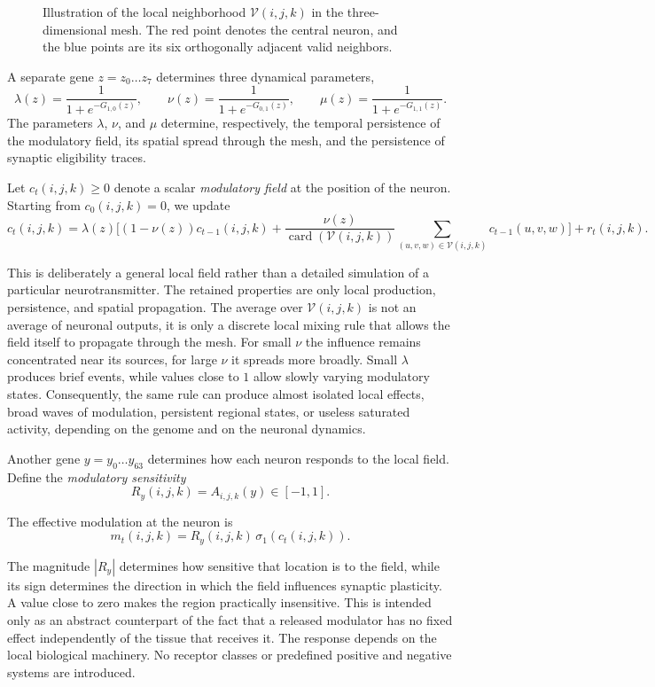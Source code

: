\documentclass[12pt,a4paper]{article}
\newcommand{\card}{\operatorname{card}}
\begin{document}
\begin{enumerate}
\begin{figure}[h]
\begin{tikzpicture}[
		x={(1cm,0cm)},
		y={(0.55cm,0.28cm)},
		z={(0cm,1cm)},
		scale=1.2,
		every node/.style={font=\small}
	]
	\end{tikzpicture}
	\caption{\footnotesize{Illustration of the local neighborhood $\mathcal{V}(i,j,k)$ in the three-dimensional mesh. The red point denotes the central neuron, and the blue points are its six orthogonally adjacent valid neighbors.}}
	\label{fig:local_neighborhood}
	\end{figure}

	A separate gene $z=z_0\ldots z_7$ determines three dynamical parameters,
	$$\lambda(z)=\frac{1}{1+e^{-G_{1,0}(z)}},\qquad \nu(z)=\frac{1}{1+e^{-G_{0,1}(z)}},\qquad \mu(z)=\frac{1}{1+e^{-G_{1,1}(z)}}.$$
	The parameters $\lambda$, $\nu$, and $\mu$ determine, respectively, the temporal persistence of the modulatory field, its spatial spread through the mesh, and the persistence of synaptic eligibility traces. 
	
	Let $c_t(i,j,k)\geq0$ denote a scalar \emph{modulatory field} at the position of the neuron. Starting from $c_0(i,j,k)=0$, we update	
	$$c_t(i,j,k)=\lambda(z)\Bigg[(1-\nu(z))c_{t-1}(i,j,k) + \frac{\nu(z)}{\card(\mathcal{V}(i,j,k))}\sum_{(u,v,w)\in\mathcal{V}(i,j,k)}c_{t-1}(u,v,w)\Bigg]+r_t(i,j,k).$$
	
	This is deliberately a general local field rather than a detailed simulation of a particular neurotransmitter. The retained properties are only local production, persistence, and spatial propagation. The average over $\mathcal{V}(i,j,k)$ is not an average of neuronal outputs, it is only a discrete local mixing rule that allows the field itself to propagate through the mesh. For small $\nu$ the influence remains concentrated near its sources, for large $\nu$ it spreads more broadly. Small $\lambda$ produces brief events, while values close to $1$ allow slowly varying modulatory states. Consequently, the same rule can produce almost isolated local effects, broad waves of modulation, persistent regional states, or useless saturated activity, depending on the genome and on the neuronal dynamics.

	Another gene $y=y_0\ldots y_{63}$ determines how each neuron responds to the local field. Define the \emph{modulatory sensitivity}
	$$R_y(i, j, k) = A_{i,j,k}(y)\in[-1,1].$$
	
	The effective modulation at the neuron is
	$$m_t(i,j,k)=R_y(i,j,k)\,\sigma_1\left(c_t(i,j,k)\right).$$
	
	The magnitude $|R_y|$ determines how sensitive that location is to the field, while its sign determines the direction in which the field influences synaptic plasticity. A value close to zero makes the region practically insensitive. This is intended only as an abstract counterpart of the fact that a released modulator has no fixed effect independently of the tissue that receives it. The response depends on the local biological machinery. No receptor classes or predefined positive and negative systems are introduced.


\end{enumerate}
\end{document}

